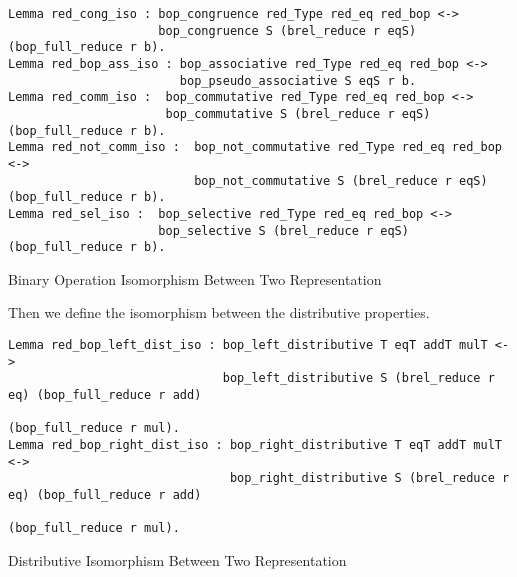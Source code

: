 \begin{listing}[H]
\begin{verbatim}
Lemma red_cong_iso : bop_congruence red_Type red_eq red_bop <-> 
                     bop_congruence S (brel_reduce r eqS) (bop_full_reduce r b).
Lemma red_bop_ass_iso : bop_associative red_Type red_eq red_bop <-> 
                        bop_pseudo_associative S eqS r b. 
Lemma red_comm_iso :  bop_commutative red_Type red_eq red_bop <-> 
                      bop_commutative S (brel_reduce r eqS) (bop_full_reduce r b).
Lemma red_not_comm_iso :  bop_not_commutative red_Type red_eq red_bop <-> 
                          bop_not_commutative S (brel_reduce r eqS) (bop_full_reduce r b).
Lemma red_sel_iso :  bop_selective red_Type red_eq red_bop <-> 
                     bop_selective S (brel_reduce r eqS) (bop_full_reduce r b).
\end{verbatim}
\caption{Binary Operation Isomorphism Between Two Representation} 
\label{coq:proof:bop_iso}
\end{listing}

Then we define the isomorphism between the distributive properties.
\begin{listing}[H]
\begin{verbatim}
Lemma red_bop_left_dist_iso : bop_left_distributive T eqT addT mulT <-> 
                              bop_left_distributive S (brel_reduce r eq) (bop_full_reduce r add) 
                                                                         (bop_full_reduce r mul).
Lemma red_bop_right_dist_iso : bop_right_distributive T eqT addT mulT <-> 
                               bop_right_distributive S (brel_reduce r eq) (bop_full_reduce r add) 
                                                                           (bop_full_reduce r mul).                                                                         
\end{verbatim}
\caption{Distributive Isomorphism Between Two Representation} 
\label{coq:proof:distributive_iso}
\end{listing}

